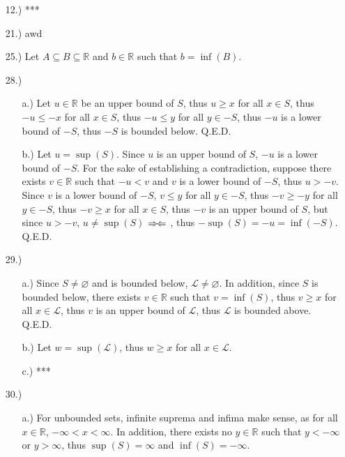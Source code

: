 \documentclass[12pt]{article}
\newcommand{\contradiction}{
    \ensuremath{{\Rightarrow\mspace{-2mu}\Leftarrow}}
}
\begin{document}
\pagestyle{fancy}
\fancyhead{}

\normalsize
\begin{itemize}
    \item [12.)] ***

    \item [21.)] awd

    \item [25.)] Let $A\subseteq B\subseteq\mathbb{R}$ and $b\in\mathbb{R}$ such that $b=\inf(B)$.

    \item [28.)] \begin{itemize}
        \item [a.)] Let $u\in\mathbb{R}$ be an upper bound of $S$, thus $u\geq x$ for all $x\in S$, thus $-u\leq-x$ for all $x\in S$, thus $-u\leq y$ for all $y\in-S$, thus $-u$ is a lower bound of $-S$, thus $-S$ is bounded below. Q.E.D.

        \item [b.)] Let $u=\sup(S)$. Since $u$ is an upper bound of $S$, $-u$ is a lower bound of $-S$. For the sake of establishing a contradiction, suppose there exists $v\in\mathbb{R}$ such that $-u<v$ and $v$ is a lower bound of $-S$, thus $u>-v$. Since $v$ is a lower bound of $-S$, $v\leq y$ for all $y\in-S$, thus $-v\geq-y$ for all $y\in-S$, thus $-v\geq x$ for all $x\in S$, thus $-v$ is an upper bound of $S$, but since $u>-v$, $u\neq\sup(S)$\contradiction, thus $-\sup(S)=-u=\inf(-S)$. Q.E.D.
    \end{itemize}

    \item [29.)] \begin{itemize}
        \item [a.)] Since $S\neq\varnothing$ and is bounded below, $\mathscr{L}\neq\varnothing$. In addition, since $S$ is bounded below, there exists $v\in\mathbb{R}$ such that $v=\inf(S)$, thus $v\geq x$ for all $x\in\mathscr{L}$, thus $v$ is an upper bound of $\mathscr{L}$, thus $\mathscr{L}$ is bounded above. Q.E.D.

        \item [b.)] Let $w=\sup(\mathscr{L})$, thus $w\geq x$ for all $x\in\mathscr{L}$.

        \item [c.)] ***
    \end{itemize}

    \item [30.)] \begin{itemize}
        \item [a.)] For unbounded sets, infinite suprema and infima make sense, as for all $x\in\mathbb{R}$, $-\infty<x<\infty$. In addition, there exists no $y\in\mathbb{R}$ such that $y<-\infty$ or $y>\infty$, thus $\sup(S)=\infty$ and $\inf(S)=-\infty$.


\end{itemize}
\end{itemize}
\end{document}
